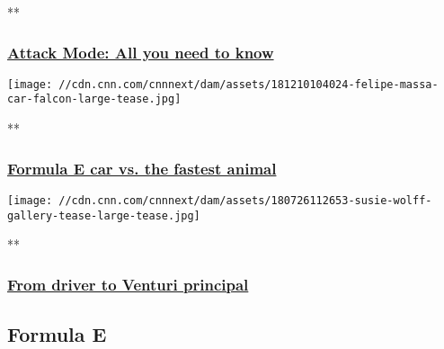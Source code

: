 **

\hypertarget{attack-mode-all-you-need-to-know}{%
\subsubsection{\texorpdfstring{\href{/videos/sports/2018/12/21/formula-e-attack-mode-season-five-explainer-supercharged-vision-spt-intl.cnn}{Attack
Mode: All you need to
know}}{Attack Mode: All you need to know}}\label{attack-mode-all-you-need-to-know}}

\href{/videos/sports/2018/12/10/gen2-peregrine-falcon-cheetah-formula-e-race-felipe-massa-supercharged-spt-intl.cnn}{}

\texttt{[image: //cdn.cnn.com/cnnnext/dam/assets/181210104024-felipe-massa-car-falcon-large-tease.jpg]}

**

\hypertarget{formula-e-car-vs-the-fastest-animal}{%
\subsubsection{\texorpdfstring{\href{/videos/sports/2018/12/10/gen2-peregrine-falcon-cheetah-formula-e-race-felipe-massa-supercharged-spt-intl.cnn}{Formula
E car vs. the fastest
animal}}{Formula E car vs. the fastest animal}}\label{formula-e-car-vs-the-fastest-animal}}

\href{/videos/sports/2018/07/27/susie-wolff-venturi-formula-e-williams-f1-supercharged-spt-intl.cnn}{}

\texttt{[image: //cdn.cnn.com/cnnnext/dam/assets/180726112653-susie-wolff-gallery-tease-large-tease.jpg]}

**

\hypertarget{from-driver-to-venturi-principal}{%
\subsubsection{\texorpdfstring{\href{/videos/sports/2018/07/27/susie-wolff-venturi-formula-e-williams-f1-supercharged-spt-intl.cnn}{From
driver to Venturi
principal}}{From driver to Venturi principal}}\label{from-driver-to-venturi-principal}}

\hypertarget{formula-e-}{%
\subsection{Formula E~}\label{formula-e-}}

